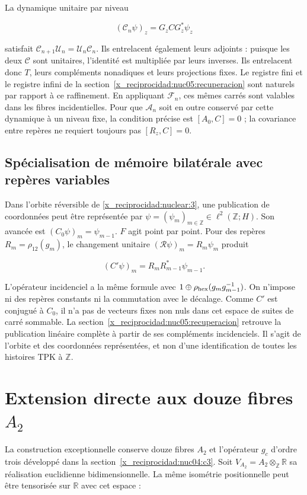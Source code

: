 La dynamique unitaire par niveau

\[
(\mathscr C_n\psi)_z=G_zCG_z^*\psi_z
\]

satisfait \(\mathscr C_{n+1}\mathscr U_n=\mathscr U_n\mathscr C_n\). Ils entrelacent également leurs adjoints : puisque les deux \(\mathscr C\) sont unitaires, l’identité est multipliée par leurs inverses. Ils entrelacent donc \(T\), leurs compléments nonadiques et leurs projections fixes. Le registre fini et le registre infini de la section~\ref{x_reciprocidad:nuc05:recuperacion} sont naturels par rapport à ce raffinement. En appliquant \(\mathscr F_n\), ces mêmes carrés sont valables dans les fibres incidentielles. Pour que \(\mathscr A_n\) soit en outre conservé par cette dynamique à un niveau fixe, la condition précise est \([A_0,C]=0\) ; la covariance entre repères ne requiert toujours pas \([R_z,C]=0\).

\subsection{Spécialisation de mémoire bilatérale avec repères variables}

Dans l’orbite réversible de \cref{x_reciprocidad:nuclear:3}, une publication de coordonnées peut être représentée par \(\psi=(\psi_m)_{m\in\mathbb Z}\in\ell^2(\mathbb Z;H)\). Son avancée est \((C_0\psi)_m=\psi_{m-1}\). \(F\) agit point par point. Pour des repères \(R_m=\rho_{12}(g_m)\), le changement unitaire \((\mathscr R\psi)_m=R_m\psi_m\) produit

\[
(C'\psi)_m=R_mR_{m-1}^*\psi_{m-1}.
\]

L’opérateur incidenciel a la même formule avec \(1\oplus\rho_{\rm hex}(g_mg_{m-1}^{-1})\). On n’impose ni des repères constants ni la commutation avec le décalage. Comme \(C'\) est conjugué à \(C_0\), il n’a pas de vecteurs fixes non nuls dans cet espace de suites de carré sommable. La section~\ref{x_reciprocidad:nuc05:recuperacion} retrouve la publication linéaire complète à partir de ses compléments incidenciels. Il s’agit de l’orbite et des coordonnées représentées, et non d’une identification de toutes les histoires TPK à \(\mathbb Z\).

\section{Extension directe aux douze fibres \texorpdfstring{\(A_2\)}{A2}}\label{x_reciprocidad:nuc05:a2}

La construction exceptionnelle conserve douze fibres \(A_2\) et l’opérateur \(g_c\) d’ordre trois développé dans la section~\ref{x_reciprocidad:nuc04:c3}. Soit \(V_{A_2}=A_2\otimes_{\mathbb Z}\mathbb R\) sa réalisation euclidienne bidimensionnelle. La même isométrie positionnelle peut être tensorisée sur \(\mathbb R\) avec cet espace :

